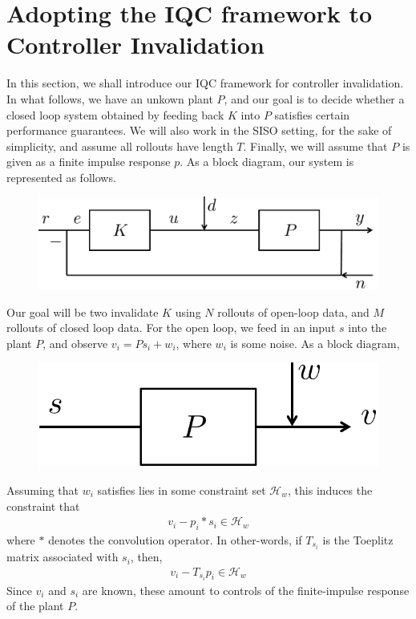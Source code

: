 \documentclass[11pt]{article} %
\theoremstyle{plain}
\theoremstyle{definition}
\theoremstyle{remark}
\begin{document}
\section{Adopting the IQC framework to Controller Invalidation}
In this section, we shall introduce our IQC framework for controller invalidation. In what follows, we have an unkown plant $P$, and our goal is to decide whether a closed loop system obtained by feeding back $K$ into $P$ satisfies certain performance guarantees. We will also work in the SISO setting, for the sake of simplicity, and assume all rollouts have length $T$. Finally, we will assume that $P$ is given as a finite impulse response $p$. As a block diagram, our system is represented as follows.
\begin{figure}[!ht]
  \centering
  \includegraphics[width=.5\linewidth]{sys2.pdf}
\end{figure}
Our goal will be two invalidate $K$ using $N$ rollouts of open-loop data, and $M$ rollouts of closed loop data. For the open loop, we feed in an input $s$ into the plant $P$, and observe $v_i = Ps_i + w_i$, where $w_i$ is some noise. As a block diagram, 
\begin{figure}[!ht]
  \centering
  \includegraphics[width=.3\linewidth]{sys3.pdf}
\end{figure}
Assuming that $w_i$ satisfies lies in some constraint set $\mathcal{H}_w$, this induces the constraint that
\begin{eqnarray}
v_i - p_i * s_i \in \mathcal{H}_{w} 
\end{eqnarray}
where $*$ denotes the convolution operator. In other-words, if $T_{s_i}$ is the Toeplitz matrix associated with $s_i$, then, 
\begin{eqnarray}
v_i - T_{s_i} p_i  \in \mathcal{H}_{w} 
\end{eqnarray}
Since $v_i$ and $s_i$ are known, these amount to controls of the finite-impulse response of the plant $P$. 
\end{document}
